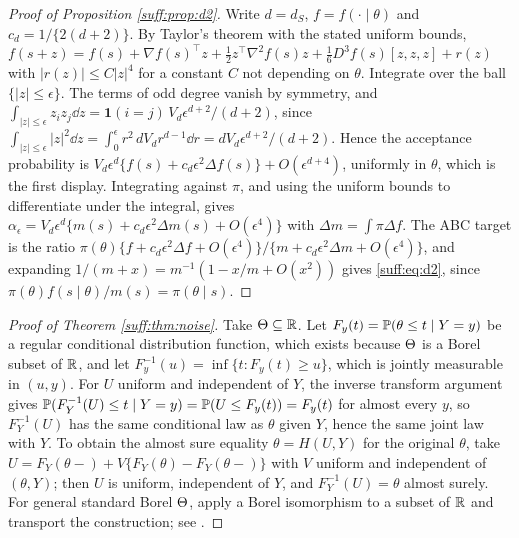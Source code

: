 \begin{proof}[Proof of Proposition \ref{suff:prop:d2}]
Write $d=d_S$, $f=f(\cdot\mid\theta)$ and $c_d=1/\{2(d+2)\}$. By Taylor's theorem with the
stated uniform bounds,
$f(s+z)=f(s)+\nabla f(s)^\top z+\tfrac12z^\top\nabla^2 f(s)z+\tfrac16D^3f(s)[z,z,z]+r(z)$
with $|r(z)|\le C|z|^4$ for a constant $C$ not depending on $\theta$. Integrate over the ball
$\{|z|\le\epsilon\}$. The terms of odd degree vanish by symmetry, and
$\int_{|z|\le\epsilon}z_iz_j\dd z=\mathbf 1(i=j)\,V_d\epsilon^{d+2}/(d+2)$, since
$\int_{|z|\le\epsilon}|z|^2\dd z=\int_0^\epsilon r^2\,dV_dr^{d-1}\dd r=dV_d\epsilon^{d+2}/(d+2)$.
Hence the acceptance probability is $V_d\epsilon^d\{f(s)+c_d\epsilon^2\Delta f(s)\}+O(\epsilon^{d+4})$,
uniformly in $\theta$, which is the first display. Integrating against $\pi$, and using the
uniform bounds to differentiate under the integral, gives
$\alpha_\epsilon=V_d\epsilon^d\{m(s)+c_d\epsilon^2\Delta m(s)+O(\epsilon^4)\}$ with
$\Delta m=\int\pi\Delta f$. The ABC target is the ratio
$\pi(\theta)\{f+c_d\epsilon^2\Delta f+O(\epsilon^4)\}/\{m+c_d\epsilon^2\Delta m+O(\epsilon^4)\}$,
and expanding $1/(m+x)=m^{-1}(1-x/m+O(x^2))$ gives \eqref{suff:eq:d2}, since
$\pi(\theta)f(s\mid\theta)/m(s)=\pi(\theta\mid s)$.
\end{proof}

\begin{proof}[Proof of Theorem \ref{suff:thm:noise}]
Take $\Theta\subseteq\mathbb{R}$. Let $F_y(t) = \mathbb{P}(\theta\le t\mid Y=y)$ be a regular conditional
distribution function, which exists because $\Theta$ is a Borel subset of $\mathbb{R}$, and let
$F_y^{-1}(u)=\inf\{t: F_y(t)\ge u\}$, which is jointly measurable in $(u,y)$. For $U$ uniform
and independent of $Y$, the inverse transform argument gives
$\mathbb{P}(F_Y^{-1}(U)\le t\mid Y=y) = \mathbb{P}(U\le F_y(t))=F_y(t)$ for almost every $y$, so
$F_Y^{-1}(U)$ has the same conditional law as $\theta$ given $Y$, hence the same joint law
with $Y$. To obtain the almost sure equality $\theta=H(U,Y)$ for the original $\theta$, take
$U=F_Y(\theta-)+V\{F_Y(\theta)-F_Y(\theta-)\}$ with $V$ uniform and independent of
$(\theta,Y)$; then $U$ is uniform, independent of $Y$, and $F_Y^{-1}(U)=\theta$ almost surely.
For general standard Borel $\Theta$, apply a Borel isomorphism to a subset of $\mathbb{R}$ and transport
the construction; see \citet[Theorem 6.10]{suff:kallenberg2002}.
\end{proof}

